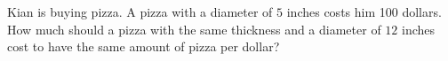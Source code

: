 Kian is buying pizza. A pizza with a diameter of $5$ inches costs him 100 dollars. How much should a pizza with the same thickness and a diameter of $12$ inches cost to have the same amount of pizza per dollar?
